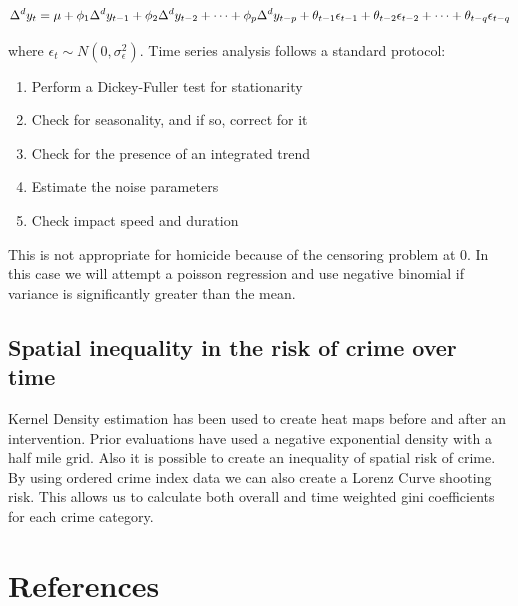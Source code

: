 \documentclass[11pt]{article}
\begin{document}
\begin{equation}
\Delta^d y_t = \mu + \phi_1 \Delta^d y_{t-1} + \phi_2 \Delta^d y_{t-2} + \cdots + \phi_p \Delta^d y_{t-p} + \\
\theta_{t-1} \epsilon_{t-1} + \theta_{t-2} \epsilon_{t-2} + \cdots + \theta_{t-q} \epsilon_{t-q}
\end{equation}

where \( \epsilon_t \sim N(0, \sigma^2_{\epsilon}) \).  Time series analysis follows a standard protocol:

\begin{enumerate}
\item Perform a Dickey-Fuller test for stationarity
\item Check for seasonality, and if so, correct for it
\item Check for the presence of an integrated trend
\item Estimate the noise parameters
\item Check impact speed and duration
\end{enumerate}

This is not appropriate for homicide because of the censoring problem at 0.  In this case we will attempt a
poisson regression and use negative binomial if variance is significantly greater than the mean.
\subsection{Spatial inequality in the risk of crime over time}
\label{sec-4-2}

Kernel Density estimation has been used to create heat maps before and after an intervention.  Prior 
evaluations have used a negative exponential density with a half mile grid.  Also it is possible to
create an inequality of spatial risk of crime.  By using ordered crime index data we can also create a
Lorenz Curve shooting risk.  This allows us to calculate both overall and time weighted gini coefficients 
for each crime category.
\section{References}
\label{sec-5}

\printbibliography[heading=none]
\end{document}
